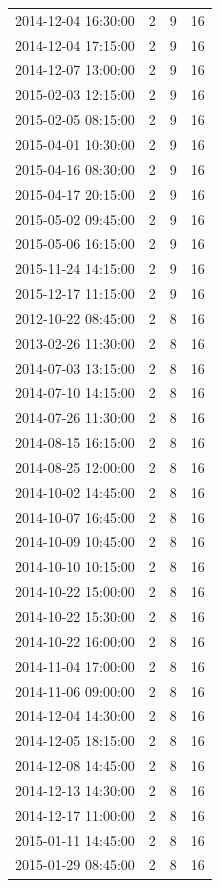 \begin{tabular}{lrrr}
2014-12-04 16:30:00 & 2 & 9 & 16 \\
2014-12-04 17:15:00 & 2 & 9 & 16 \\
2014-12-07 13:00:00 & 2 & 9 & 16 \\
2015-02-03 12:15:00 & 2 & 9 & 16 \\
2015-02-05 08:15:00 & 2 & 9 & 16 \\
2015-04-01 10:30:00 & 2 & 9 & 16 \\
2015-04-16 08:30:00 & 2 & 9 & 16 \\
2015-04-17 20:15:00 & 2 & 9 & 16 \\
2015-05-02 09:45:00 & 2 & 9 & 16 \\
2015-05-06 16:15:00 & 2 & 9 & 16 \\
2015-11-24 14:15:00 & 2 & 9 & 16 \\
2015-12-17 11:15:00 & 2 & 9 & 16 \\
2012-10-22 08:45:00 & 2 & 8 & 16 \\
2013-02-26 11:30:00 & 2 & 8 & 16 \\
2014-07-03 13:15:00 & 2 & 8 & 16 \\
2014-07-10 14:15:00 & 2 & 8 & 16 \\
2014-07-26 11:30:00 & 2 & 8 & 16 \\
2014-08-15 16:15:00 & 2 & 8 & 16 \\
2014-08-25 12:00:00 & 2 & 8 & 16 \\
2014-10-02 14:45:00 & 2 & 8 & 16 \\
2014-10-07 16:45:00 & 2 & 8 & 16 \\
2014-10-09 10:45:00 & 2 & 8 & 16 \\
2014-10-10 10:15:00 & 2 & 8 & 16 \\
2014-10-22 15:00:00 & 2 & 8 & 16 \\
2014-10-22 15:30:00 & 2 & 8 & 16 \\
2014-10-22 16:00:00 & 2 & 8 & 16 \\
2014-11-04 17:00:00 & 2 & 8 & 16 \\
2014-11-06 09:00:00 & 2 & 8 & 16 \\
2014-12-04 14:30:00 & 2 & 8 & 16 \\
2014-12-05 18:15:00 & 2 & 8 & 16 \\
2014-12-08 14:45:00 & 2 & 8 & 16 \\
2014-12-13 14:30:00 & 2 & 8 & 16 \\
2014-12-17 11:00:00 & 2 & 8 & 16 \\
2015-01-11 14:45:00 & 2 & 8 & 16 \\
2015-01-29 08:45:00 & 2 & 8 & 16 \\

\end{tabular}
